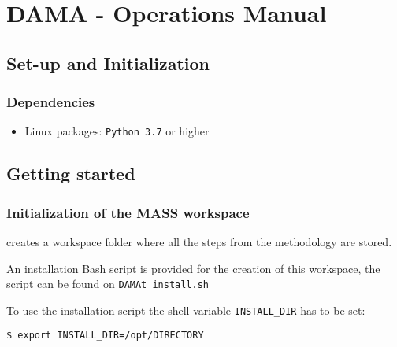 
\chapter{DAMA - Operations Manual}

\section{Set-up and Initialization}


\subsection{Dependencies}


\begin{itemize}
	\item Linux packages: \texttt{Python 3.7} or higher
\end{itemize}


\section{Getting started}

\subsection{Initialization of the MASS workspace}


\DAMA creates a workspace folder where all the steps from the methodology are stored.

An installation Bash script is provided for the creation of this workspace, the script can be found on \texttt{DAMAt_install.sh}

To use the installation script the shell variable \texttt{INSTALL\_DIR} has to be set:

\begin{lstlisting}[language=bash]
  $ export INSTALL_DIR=/opt/DIRECTORY
\end{lstlisting}

%



